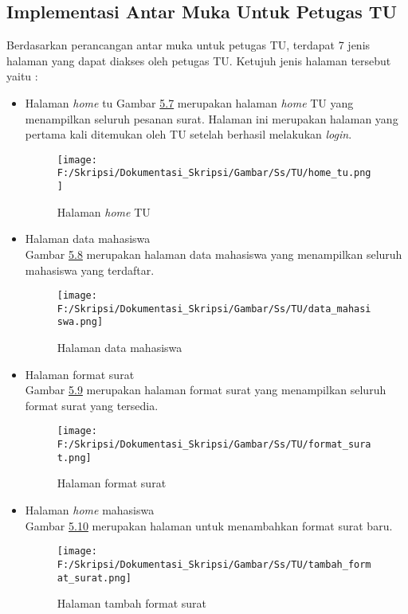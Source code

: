 \subsection{Implementasi Antar Muka Untuk Petugas TU}
\label{sec:implementasi_antar_muka_petugas_tu}
Berdasarkan perancangan antar muka untuk petugas TU, terdapat 7 jenis halaman yang dapat diakses oleh petugas TU. Ketujuh jenis halaman tersebut yaitu :
\begin{itemize}
	\item Halaman \textit{home} tu
	 Gambar \hyperlink{halaman_home_tu}{5.7} merupakan halaman \textit{home} TU yang menampilkan seluruh pesanan surat. Halaman ini merupakan halaman yang pertama kali ditemukan oleh TU setelah berhasil melakukan \textit{login}.
	 \begin{figure}[H]
	\centering
		\texttt{[image: F:/Skripsi/Dokumentasi\_Skripsi/Gambar/Ss/TU/home\_tu.png]}
		\caption{Halaman \textit{home} TU}
		\label{fig:halaman_home_tu}
	\end{figure}

	\item Halaman data mahasiswa\\
	 Gambar \hyperlink{implementasi_halaman_data_mahasiswa}{5.8} merupakan halaman data mahasiswa yang menampilkan seluruh mahasiswa yang terdaftar.
	 \begin{figure}[H]
	\centering
		\texttt{[image: F:/Skripsi/Dokumentasi\_Skripsi/Gambar/Ss/TU/data\_mahasiswa.png]}
		\caption{Halaman data mahasiswa}
		\label{fig:implementasi_halaman_data_mahasiswa}
	\end{figure}
	
	\item Halaman format surat\\
	 Gambar \hyperlink{implementasi_halaman_format_surat}{5.9} merupakan halaman format surat yang menampilkan seluruh format surat yang tersedia.
	 \begin{figure}[H]
	\centering
		\texttt{[image: F:/Skripsi/Dokumentasi\_Skripsi/Gambar/Ss/TU/format\_surat.png]}
		\caption{Halaman format surat}
		\label{fig:implementasi_halaman_format_surat}
	\end{figure}
	
	\item Halaman \textit{home} mahasiswa\\
	 Gambar \hyperlink{implementasi_halaman_tambah_format_surat}{5.10} merupakan halaman untuk menambahkan format surat baru.
	 \begin{figure}[H]
	\centering
		\texttt{[image: F:/Skripsi/Dokumentasi\_Skripsi/Gambar/Ss/TU/tambah\_format\_surat.png]}
		\caption{Halaman tambah format surat}
		\label{fig:implementasi_halaman_tambah_format_surat}
	\end{figure}
	

\end{itemize}
